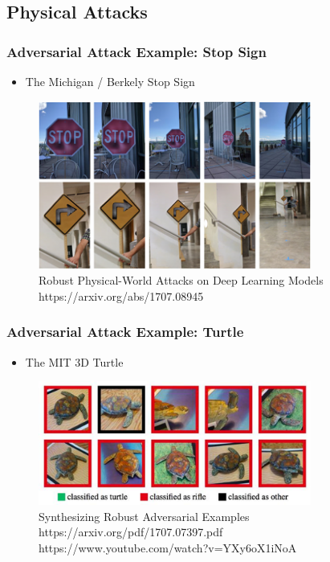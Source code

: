 \documentclass[8pt,dvipsnames]{beamer}
\begin{document}
\subsection{Physical Attacks}
\begin{frame}
	\frametitle{Adversarial Attack Example: Stop Sign}
	\begin{itemize}
		\item The Michigan / Berkely Stop Sign
	\end{itemize}
	\begin{figure}[htbp]
		\centering
		\includegraphics[width=0.8\textwidth]{imgs/adv_overview_6.png}
		\caption{Robust Physical-World Attacks on Deep Learning Models https://arxiv.org/abs/1707.08945}
	\end{figure}
\end{frame}

\begin{frame}
	\frametitle{Adversarial Attack Example: Turtle}
	\begin{itemize}
		\item The MIT 3D Turtle
	\end{itemize}
	\begin{figure}[htbp]
		\centering
		\includegraphics[width=0.8\textwidth]{imgs/adv_overview_7.png}
		\caption{Synthesizing Robust Adversarial Examples https://arxiv.org/pdf/1707.07397.pdf https://www.youtube.com/watch?v=YXy6oX1iNoA}
	\end{figure}
	
\end{frame}
\end{document}
